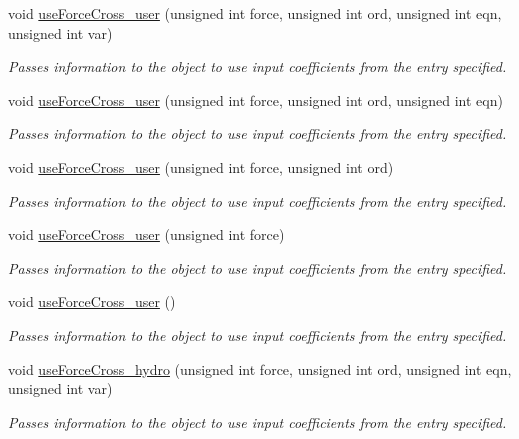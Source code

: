 \begin{DoxyCompactItemize}
void \hyperlink{classosea_1_1ofreq_1_1_motion_model_a1159117995080d2b62e50fceaeb29778}{use\-Force\-Cross\-\_\-user} (unsigned int force, unsigned int ord, unsigned int eqn, unsigned int var)
\begin{DoxyCompactList}\small\item\em Passes information to the object to use input coefficients from the entry specified. \end{DoxyCompactList}\item 
void \hyperlink{classosea_1_1ofreq_1_1_motion_model_a3eabe29c2306d9a36445cfb4b27c4b02}{use\-Force\-Cross\-\_\-user} (unsigned int force, unsigned int ord, unsigned int eqn)
\begin{DoxyCompactList}\small\item\em Passes information to the object to use input coefficients from the entry specified. \end{DoxyCompactList}\item 
void \hyperlink{classosea_1_1ofreq_1_1_motion_model_ac507056503b23bddf1e5fcf5850b7e8b}{use\-Force\-Cross\-\_\-user} (unsigned int force, unsigned int ord)
\begin{DoxyCompactList}\small\item\em Passes information to the object to use input coefficients from the entry specified. \end{DoxyCompactList}\item 
void \hyperlink{classosea_1_1ofreq_1_1_motion_model_af629a294d6f304b0357a514c9cf5dcf9}{use\-Force\-Cross\-\_\-user} (unsigned int force)
\begin{DoxyCompactList}\small\item\em Passes information to the object to use input coefficients from the entry specified. \end{DoxyCompactList}\item 
void \hyperlink{classosea_1_1ofreq_1_1_motion_model_a9858717cea37d004dd02a5906225d765}{use\-Force\-Cross\-\_\-user} ()
\begin{DoxyCompactList}\small\item\em Passes information to the object to use input coefficients from the entry specified. \end{DoxyCompactList}\item 
void \hyperlink{classosea_1_1ofreq_1_1_motion_model_abfd6e4a22ec23d7ee462adb737fab3f2}{use\-Force\-Cross\-\_\-hydro} (unsigned int force, unsigned int ord, unsigned int eqn, unsigned int var)
\begin{DoxyCompactList}\small\item\em Passes information to the object to use input coefficients from the entry specified. \end{DoxyCompactList}\item 

\end{DoxyCompactItemize}
